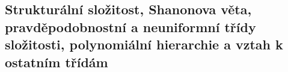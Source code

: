 \subsection{Strukturální složitost, Shanonova věta, pravděpodobnostní a neuniformní třídy složitosti, polynomiální hierarchie a vztah k ostatním třídám}